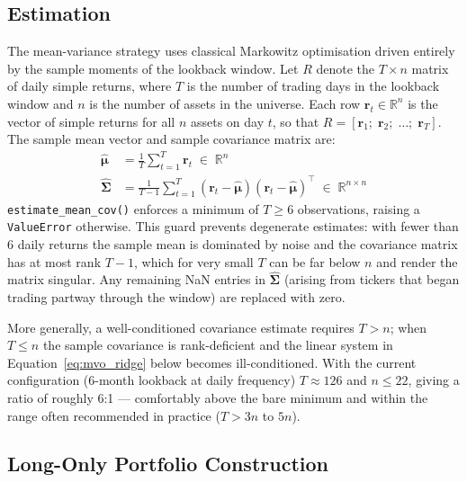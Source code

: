 \documentclass[11pt, a4paper]{article}
\newcommand{\code}[1]{\texttt{#1}}
\begin{document}
\subsection{Estimation}

The mean-variance strategy uses classical Markowitz optimisation driven
entirely by the sample moments of the lookback window.
Let $R$ denote the $T \times n$ matrix of daily simple returns, where $T$ is the
number of trading days in the lookback window and $n$ is the number of assets
in the universe. Each row $\bm{r}_t \in \mathbb{R}^{n}$ is the vector of
simple returns for all $n$ assets on day $t$, so that $R = [\bm{r}_1;\; \bm{r}_2;\;
\ldots;\; \bm{r}_T]$. The sample mean vector and sample covariance matrix are:
\begin{align}
  \hat{\bm{\mu}} &= \frac{1}{T}\sum_{t=1}^{T} \bm{r}_t
    \;\in\; \mathbb{R}^{n}
  \label{eq:mu_hat} \\[4pt]
  \hat{\bm{\Sigma}} &= \frac{1}{T-1}\sum_{t=1}^{T}
    (\bm{r}_t - \hat{\bm{\mu}})(\bm{r}_t - \hat{\bm{\mu}})^{\top}
    \;\in\; \mathbb{R}^{n \times n}
  \label{eq:sigma_hat}
\end{align}
\code{estimate\_mean\_cov()} enforces a minimum of $T \geq 6$ observations,
raising a \code{ValueError} otherwise. This guard prevents degenerate
estimates: with fewer than 6 daily returns the sample mean is dominated by
noise and the covariance matrix has at most rank $T - 1$, which for very small
$T$ can be far below $n$ and render the matrix singular. Any remaining NaN
entries in $\hat{\bm{\Sigma}}$ (arising from tickers that began trading
partway through the window) are replaced with zero.

More generally, a well-conditioned covariance estimate requires $T > n$; when
$T \leq n$ the sample covariance is rank-deficient and the linear system in
Equation~\eqref{eq:mvo_ridge} below becomes ill-conditioned. With the current
configuration (6-month lookback at daily frequency) $T \approx 126$ and
$n \leq 22$, giving a ratio of roughly 6:1 --- comfortably above the bare
minimum and within the range often recommended in practice ($T > 3n$ to $5n$).

\subsection{Long-Only Portfolio Construction}
\end{document}
